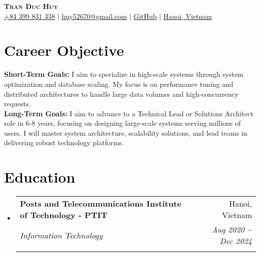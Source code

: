 \documentclass[letterpaper,11pt]{article}
\makeatletter
\newcommand{\resumeEducationHeading}[6]{
  \vspace{-2pt}\item
    \begin{tabular*}{0.97\textwidth}[t]{l@{\extracolsep{\fill}}r}
      \textbf{#1} & #2 \\
      \textit{\small#3} & \textit{\small #4} \\
      \textit{\small#5} & \textit{\small #6} \\
    \end{tabular*}\vspace{-5pt}
}
\newcommand{\resumeSubHeadingListStart}{\begin{itemize}[leftmargin=0.15in, label={}]}
\newcommand{\resumeSubHeadingListEnd}{\end{itemize}}
\makeatother
\begin{document}
\begin{center}
  \textbf{\Huge \scshape Tran Duc Huy} \\ \vspace{4pt}
  \small
  \faMobile \hspace{.5pt} \href{tel:84399831338}{+84 399 831 338}
  $|$
  \faAt \hspace{.5pt} \href{mailto:huy52670@gmail.com}{huy52670@gmail.com}
  $|$
  \faGithub \hspace{.5pt} \href{https://github.com/ingallz}{GitHub}
  $|$
  \faMapMarker \hspace{.5pt} \href{https://www.google.com/maps/place/Hanoi,+Vietnam/@21.02288,105.7545628,12z/data=!3m1!4b1!4m6!3m5!1s0x3135ab9bd9861ca1:0xe7887f7b72ca17a9!8m2!3d21.0277644!4d105.8341598!16zL20vMGZuZmY?entry=ttu}{Hanoi, Vietnam}
\end{center}


\section{Career Objective}
\vspace{4pt}
\resumeSubHeadingListStart
\small{\item{
  \textbf{\faRocket \hspace{4pt} Short-Term Goals:}{
    I aim to specialize in high-scale systems through system optimization and database scaling. My focus is on performance tuning and distributed architectures to handle large data volumes and high-concurrency requests.
  } \\ \vspace{4pt}
  \textbf{\faBullseye \hspace{4pt} Long-Term Goals:}{
    I aim to advance to a Technical Lead or Solutions Architect role in 6-8 years, focusing on designing large-scale systems serving millions of users. I will master system architecture, scalability solutions, and lead teams in delivering robust technology platforms.
  } \\ \vspace{4pt}
}}
\resumeSubHeadingListEnd
\vspace{4pt}

\section{Education}
\vspace{4pt}
\resumeSubHeadingListStart

\resumeEducationHeading
{\textbf{\faGraduationCap \hspace{4pt} Posts and Telecommunications Institute of Technology - PTIT}}{Hanoi, Vietnam}
{Information Technology   \textbf{}}{Aug 2020 \textbf{--} Dec 2024}
{}{}
\resumeSubHeadingListEnd
\end{document}
